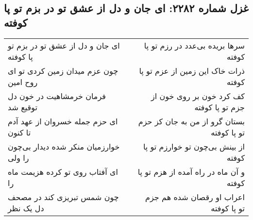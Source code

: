 \begin{center}
\section*{غزل شماره ۲۲۸۲: ای جان و دل از عشق تو در بزم تو پا کوفته}
\label{sec:2282}
\begin{longtable}{l p{0.5cm} r}
ای جان و دل از عشق تو در بزم تو پا کوفته
&&
سرها بریده بی‌عدد در رزم تو پا کوفته
\\
چون عزم میدان زمین کردی تو ای روح امین
&&
ذرات خاک این زمین از عزم تو پا کوفته
\\
فرمان خرمشاهیت در خون دل توقیع شد
&&
کف کرد خون بر روی خون از جزم تو پا کوفته
\\
ای حزم جمله خسروان از عهد آدم تا کنون
&&
بستان گرو از من به جان کز حزم تو پا کوفته
\\
خوارزمیان منکر شده دیدار بی‌چون را ولی
&&
از بینش بی‌چون تو خوارزم تو پا کوفته
\\
ای آفتاب روی تو کرده هزیمت ماه را
&&
و آن ماه در راه آمده از هزم تو پا کوفته
\\
چون شمس تبریزی کند در مصحف دل یک نظر
&&
اعراب او رقصان شده هم جزم تو پا کوفته
\\
\end{longtable}
\end{center}
